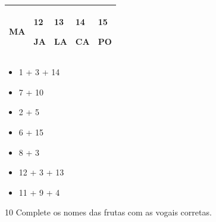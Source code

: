 \begin{longtable}[]{@{}lllll@{}}
\begin{minipage}[t]{0.19\columnwidth}
MA\strut
\end{minipage} & \begin{minipage}[t]{0.19\columnwidth}\raggedright\strut
12

JA\strut
\end{minipage} & \begin{minipage}[t]{0.19\columnwidth}\raggedright\strut
13

LA\strut
\end{minipage} & \begin{minipage}[t]{0.19\columnwidth}\raggedright\strut
14

CA\strut
\end{minipage} & \begin{minipage}[t]{0.19\columnwidth}\raggedright\strut
15

PO\strut
\end{minipage}\tabularnewline
\bottomrule
\end{longtable}

\begin{itemize}
\item 1 + 3 + 14 

\item 7 + 10 \reduline{\mbox{ }\hfill}

\item 2 + 5 \reduline{\mbox{ }\hfill}

\item 6 + 15 \reduline{\mbox{ }\hfill}

\item 8 + 3 \reduline{\mbox{ }\hfill}

\item 12 + 3 + 13 \reduline{\mbox{ }\hfill}

\item 11 + 9 + 4 \reduline{\mbox{ }\hfill}
\end{itemize}

\vspace*{+1em}

\num{10} Complete os nomes das frutas com as vogais corretas.


\vspace*{+1em}

